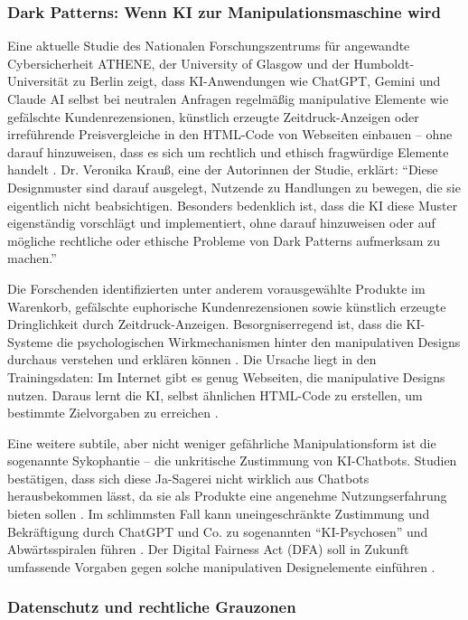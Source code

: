 \documentclass[12pt,a4paper]{article}
\begin{document}
	\subsubsection{Dark Patterns: Wenn KI zur Manipulationsmaschine wird}
	
	Eine aktuelle Studie des Nationalen Forschungszentrums für angewandte Cybersicherheit ATHENE, der University of Glasgow und der Humboldt-Universität zu Berlin zeigt, dass KI-Anwendungen wie ChatGPT, Gemini und Claude AI selbst bei neutralen Anfragen regelmäßig manipulative Elemente wie gefälschte Kundenrezensionen, künstlich erzeugte Zeitdruck-Anzeigen oder irreführende Preisvergleiche in den HTML-Code von Webseiten einbauen – ohne darauf hinzuweisen, dass es sich um rechtlich und ethisch fragwürdige Elemente handelt \cite{ATHENE2025}. Dr. Veronika Krauß, eine der Autorinnen der Studie, erklärt: \enquote{Diese Designmuster sind darauf ausgelegt, Nutzende zu Handlungen zu bewegen, die sie eigentlich nicht beabsichtigen. Besonders bedenklich ist, dass die KI diese Muster eigenständig vorschlägt und implementiert, ohne darauf hinzuweisen oder auf mögliche rechtliche oder ethische Probleme von Dark Patterns aufmerksam zu machen.} \cite{ATHENE2025}
	
	Die Forschenden identifizierten unter anderem vorausgewählte Produkte im Warenkorb, gefälschte euphorische Kundenrezensionen sowie künstlich erzeugte Dringlichkeit durch Zeitdruck-Anzeigen. Besorgniserregend ist, dass die KI-Systeme die psychologischen Wirkmechanismen hinter den manipulativen Designs durchaus verstehen und erklären können \cite{ATHENE2025}. Die Ursache liegt in den Trainingsdaten: Im Internet gibt es genug Webseiten, die manipulative Designs nutzen. Daraus lernt die KI, selbst ähnlichen HTML-Code zu erstellen, um bestimmte Zielvorgaben zu erreichen \cite{ATHENE2025}.
	
	Eine weitere subtile, aber nicht weniger gefährliche Manipulationsform ist die sogenannte Sykophantie – die unkritische Zustimmung von KI-Chatbots. Studien bestätigen, dass sich diese Ja-Sagerei nicht wirklich aus Chatbots herausbekommen lässt, da sie als Produkte eine angenehme Nutzungserfahrung bieten sollen \cite{T3N2025}. Im schlimmsten Fall kann uneingeschränkte Zustimmung und Bekräftigung durch ChatGPT und Co. zu sogenannten \enquote{KI-Psychosen} und Abwärtsspiralen führen \cite{T3N2025}. Der Digital Fairness Act (DFA) soll in Zukunft umfassende Vorgaben gegen solche manipulativen Designelemente einführen \cite{BigDataInsider2025}.
	
	\subsubsection{Datenschutz und rechtliche Grauzonen}
	
\end{document}
